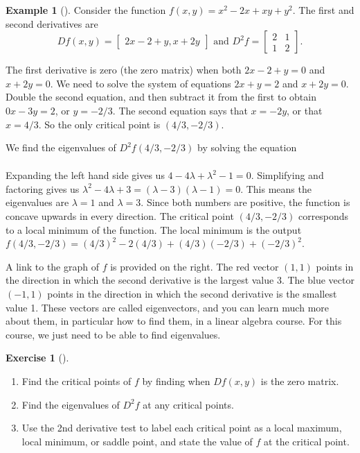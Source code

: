 \documentclass[10pt,]{book}
\theoremstyle{plain}
\theoremstyle{definition}
\theoremstyle{definition}
\theoremstyle{definition}
\newtheorem{example}[theorem]{Example}
\theoremstyle{definition}
\newtheorem{exploration}[project]{Exercise}
\theoremstyle{definition}
\numberwithin{equation}{section}
\newcommand{\amp}{&}
\begin{document}
\begin{example}[]\label{example-2}
Consider the function \(f(x,y)=x^2-2x+xy+y^2\). The first and second derivatives are%
\begin{equation*}
Df(x,y)=\begin{bmatrix}2x-2+y,x+2y
\end{bmatrix} 
\text{ and }  
D^2f = \begin{bmatrix}2\amp 1 \\1\amp 2
\end{bmatrix} .
\end{equation*}
%
\par
The first derivative is zero (the zero matrix) when both \(2x-2+y=0\) and \(x+2y=0\). We need to solve the system of equations \(2x+y=2\) and \(x+2y=0\). Double the second equation, and then subtract it from the first to obtain \(0x-3y=2\), or \(y=-2/3\). The second equation says that \(x=-2y\), or that \(x=4/3\). So the only critical point is \((4/3,-2/3)\).%
\par
We find the eigenvalues of \(D^2 f(4/3,-2/3)\) by solving the equation%
\begin{align*}

\end{align*}
%
\par
Expanding the left hand side gives us {\(4-4\lambda + \lambda^2 -1 = 0\)}. Simplifying and factoring gives us \(\lambda^2-4\lambda +3 = (\lambda-3)(\lambda -1) = 0\). This means the eigenvalues are \(\lambda = 1\) and \(\lambda=3\). Since both numbers are positive, the function is concave upwards in every direction. The critical point \((4/3,-2/3)\) corresponds to a local minimum of the function. The local minimum is the output \(f(4/3,-2/3) = (4/3)^2-2(4/3)+(4/3)(-2/3)+(-2/3)^2\).%
\par
A link to the graph of \(f\) is provided on the right. The red vector \((1,1)\) points in the direction in which the second derivative is the largest value 3. The blue vector \((-1,1)\) points in the direction in which the second derivative is the smallest value 1. These vectors are called eigenvectors, and you can learn much more about them, in particular how to find them, in a linear algebra course. For this course, we just need to be able to find eigenvalues.%
\end{example}
\begin{exploration}[]\label{exploration-236}
\leavevmode%
\begin{enumerate}[font=\bfseries,label=(\alph*),ref=\alph*]
\item\label{task-630} Find the critical points of \(f\) by finding when \(Df(x,y)\) is the zero matrix.%
\item\label{task-631} Find the eigenvalues of \(D^2f\) at any critical points.%
\item\label{task-632} Use the 2nd derivative test to label each critical point as a local maximum, local minimum, or saddle point, and state the value of \(f\) at the critical point.%
\end{enumerate}
\end{exploration}
\end{document}
